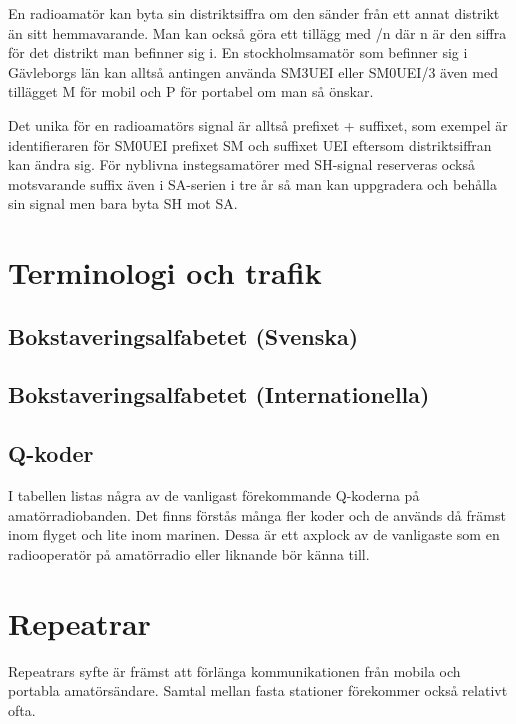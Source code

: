 En radioamatör kan byta sin distriktsiffra om den sänder från ett annat distrikt
än sitt hemmavarande. Man kan också göra ett tillägg med /n där n är den siffra
för det distrikt man befinner sig i. En stockholmsamatör som befinner sig i
Gävleborgs län kan alltså antingen använda SM3UEI eller SM0UEI/3 även med
tillägget M för mobil och P för portabel om man så önskar.

Det unika för en radioamatörs signal är alltså prefixet + suffixet, som
exempel är identifieraren för SM0UEI prefixet SM och suffixet UEI eftersom
distriktsiffran kan ändra sig. För nyblivna instegsamatörer med SH-signal
reserveras också motsvarande suffix även i SA-serien i tre år så man kan
uppgradera och behålla sin signal men bara byta SH mot SA.

\section{Terminologi och trafik}

\subsection{Bokstaveringsalfabetet (Svenska)}



\subsection{Bokstaveringsalfabetet (Internationella)}



\clearpage

\subsection{Q-koder}
I tabellen listas några av de vanligast förekommande Q-koderna på
amatörradiobanden.  Det finns förstås många fler koder och de används då
främst inom flyget och lite inom marinen. Dessa är ett axplock av de
vanligaste som en radiooperatör på amatörradio eller liknande bör känna till.



\section{Repeatrar}

Repeatrars syfte är främst att förlänga kommunikationen från mobila och
portabla amatörsändare. Samtal mellan fasta stationer förekommer också
relativt ofta.

